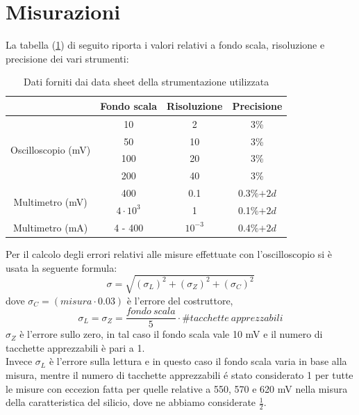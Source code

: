 \documentclass[]{article}
\begin{document}
\section{Misurazioni}
La tabella (\ref{tab:strumenti}) di seguito riporta i valori relativi a fondo scala, risoluzione e precisione dei vari strumenti:
	\begin{table}[H]
		\centering
		\begin{tabular}{|c|c|c|c|}
			\cline{2-4}
			\multicolumn{1}{c|}{} & Fondo scala & Risoluzione & Precisione \\
			\hline
			\multirow{4}{*}{Oscilloscopio (mV)} & 10 & 2 & 3\% \\
			\cline{2-4}
			& 50 & 10 & 3\% \\
			\cline{2-4}
			& 100 & 20 & 3\% \\
			\cline{2-4}
			& 200 & 40 & 3\% \\
			\hline
			\multirow{2}{*}{Multimetro (mV)} & 400 & 0.1 & 0.3\%$+2d$ \\
			\cline{2-4}
			&$4\cdot10^3$ & 1 & 0.1\%$+2d$\\
			\hline
			Multimetro (mA) & 4 - 400 & $10^{-3}$ & 0.4\%$+2d$ \\
			\hline
		\end{tabular}
	\label{tab:strumenti}
	\caption{Dati forniti dai data sheet della strumentazione utilizzata}
	\end{table}
Per il calcolo degli errori relativi alle misure effettuate con l'oscilloscopio si è usata la seguente formula:
\begin{equation}
	\sigma=\sqrt{(\sigma_{L})^{2}+(\sigma_{Z})^{2}+(\sigma_{C})^{2}}
\end{equation}
dove $\sigma_{C}= (misura\cdot0.03) $ è l'errore del costruttore,
\begin{equation*}
	\sigma_{L}=\sigma_{Z}=\frac{fondo \:scala}{5}\cdot\#tacchette \:apprezzabili
\end{equation*}
$ \sigma_{Z} $ è l'errore sullo zero, in tal caso il fondo scala vale 10 mV e il numero di tacchette apprezzabili è pari a 1.\\
Invece $ \sigma_{L} $ è l'errore sulla lettura e in questo caso il fondo scala varia in base alla misura, mentre il numero di tacchette apprezzabili é stato considerato 1 per tutte le misure con eccezion fatta per quelle relative a 550, 570 e 620 mV nella misura della caratteristica del silicio, dove ne abbiamo considerate $\frac{1}{2}$.
\end{document}
